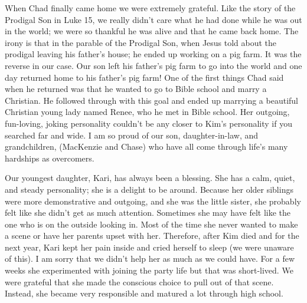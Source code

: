 \documentclass[twoside, 12pt]{book}
\begin{document}
When Chad finally came home we were extremely grateful. Like the story of the Prodigal Son in Luke 15, we really didn't care what he had done while he was out in the world; we were so thankful he was alive and that he came back home. The irony is that in the parable of the Prodigal Son, when Jesus told about the prodigal leaving his father's house; he ended up working on a pig farm. It was the reverse in our case. Our son left his father’s pig farm to go into the world and one day returned home to his father's pig farm! One of the first things Chad said when he returned was that he wanted to go to Bible school and marry a Christian. He followed through with this goal and ended up marrying a beautiful Christian young lady named Renee, who he met in Bible school. Her outgoing, fun-loving, joking personality couldn't be any closer to Kim's personality if you searched far and wide. I am so proud of our son, daughter-in-law, and grandchildren, (MacKenzie and Chase) who have all come through life's many hardships as overcomers.

Our youngest daughter, Kari, has always been a blessing. She has a calm, quiet, and steady personality; she is a delight to be around. Because her older siblings were more demonstrative and outgoing, and she was the little sister, she probably felt like she didn't get as much attention. Sometimes she may have felt like the one who is on the outside looking in. Most of the time she never wanted to make a scene or have her parents upset with her. Therefore, after Kim died and for the next year, Kari kept her pain inside and cried herself to sleep (we were unaware of this). I am sorry that we didn't help her as much as we could have. For a few weeks she experimented with joining the party life but that was short-lived. We were grateful that she made the conscious choice to pull out of that scene. Instead, she became very responsible and matured a lot through high school. 
\end{document}
